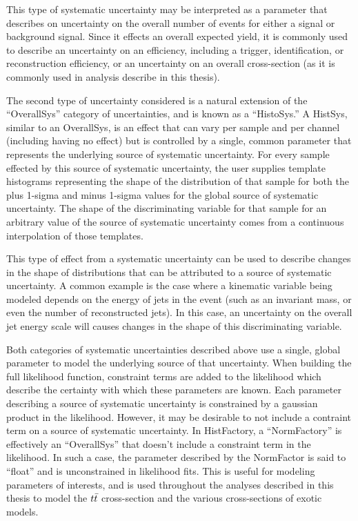 This type of systematic uncertainty may be interpreted as a parameter that describes on uncertainty on the overall number of events for either a signal or background signal.
Since it effects an overall expected yield, it is commonly used to describe an uncertainty on an efficiency, including a trigger, identification, or reconstruction efficiency, or an uncertainty on an overall cross-section (as it is commonly used in analysis describe in this thesis).

The second type of uncertainty considered is a natural extension of the ``OverallSys'' category of uncertainties, and is known as a ``HistoSys.''
A HistSys, similar to an OverallSys, is an effect that can vary per sample and per channel (including having no effect) but is controlled by a single, common parameter
that represents the underlying source of systematic uncertainty.
For every sample effected by this source of systematic uncertainty, the user supplies template histograms representing the shape of the distribution of that sample for both the plus 1-sigma and minus 1-sigma values for the global source of systematic uncertainty.
The shape of the discriminating variable for that sample for an arbitrary value of the source of systematic uncertainty comes from a continuous interpolation of those templates.

This type of effect from a systematic uncertainty can be used to describe changes in the shape of distributions that can be attributed to a source of systematic uncertainty.
A common example is the case where a kinematic variable being modeled depends on the energy of jets in the event (such as an invariant mass, or even the number of reconstructed jets).
In this case, an uncertainty on the overall jet energy scale will causes changes in the shape of this discriminating variable.

Both categories of systematic uncertainties described above use a single, global parameter to model the underlying source of that uncertainty.
When building the full likelihood function, constraint terms are added to the likelihood which describe the certainty with which these parameters are known.
Each parameter describing a source of systematic uncertainty is constrained by a gaussian product in the likelihood.
However, it may be desirable to not include a contraint term on a source of systematic uncertainty.
In HistFactory, a ``NormFactory'' is effectively an ``OverallSys'' that doesn't include a constraint term in the likelihood.
In such a case, the parameter described by the NormFactor is said to ``float'' and is unconstrained in likelihood fits.
This is useful for modeling parameters of interests, and is used throughout the analyses described in this thesis to model the $t\bar{t}$ cross-section and the various cross-sections of exotic models.

